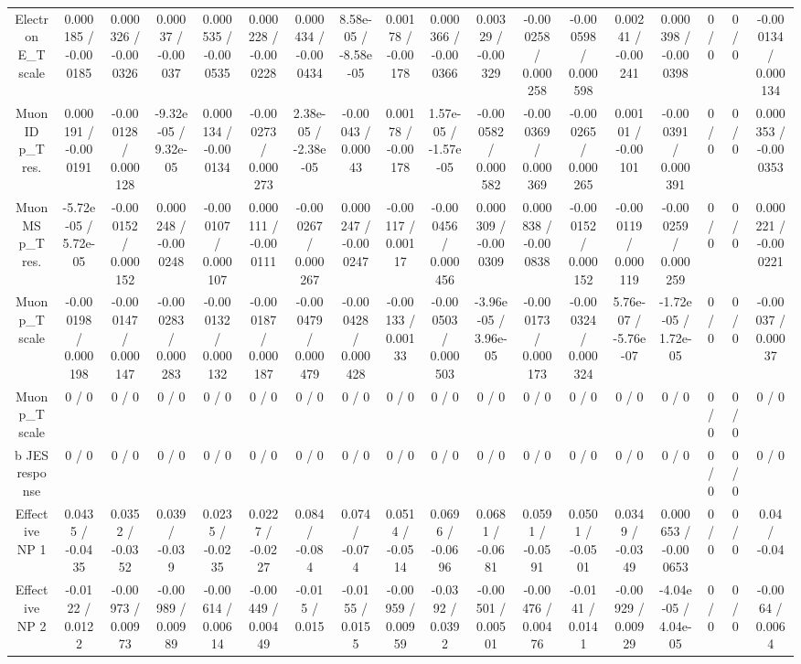 \documentclass[10pt]{article}
\begin{document}
\begin{table}[htbp]
\begin{center}
\begin{tabular}{|c|c|c|c|c|c|c|c|c|c|c|c|c|c|c|c|c|c|}
  Electron E_{T} scale & 0.000185 / -0.000185 & 0.000326 / -0.000326 & 0.00037 / -0.00037 & 0.000535 / -0.000535 & 0.000228 / -0.000228 & 0.000434 / -0.000434 & 8.58e-05 / -8.58e-05 & 0.00178 / -0.00178 & 0.000366 / -0.000366 & 0.00329 / -0.00329 & -0.000258 / 0.000258 & -0.000598 / 0.000598 & 0.00241 / -0.00241 & 0.000398 / -0.000398 & 0 / 0 & 0 / 0 & -0.000134 / 0.000134 \\ 
  Muon ID p_{T} res. & 0.000191 / -0.000191 & -0.000128 / 0.000128 & -9.32e-05 / 9.32e-05 & 0.000134 / -0.000134 & -0.000273 / 0.000273 & 2.38e-05 / -2.38e-05 & -0.00043 / 0.00043 & 0.00178 / -0.00178 & 1.57e-05 / -1.57e-05 & -0.000582 / 0.000582 & -0.000369 / 0.000369 & -0.000265 / 0.000265 & 0.00101 / -0.00101 & -0.000391 / 0.000391 & 0 / 0 & 0 / 0 & 0.000353 / -0.000353 \\ 
  Muon MS p_{T} res. & -5.72e-05 / 5.72e-05 & -0.000152 / 0.000152 & 0.000248 / -0.000248 & -0.000107 / 0.000107 & 0.000111 / -0.000111 & -0.000267 / 0.000267 & 0.000247 / -0.000247 & -0.00117 / 0.00117 & -0.000456 / 0.000456 & 0.000309 / -0.000309 & 0.000838 / -0.000838 & -0.000152 / 0.000152 & -0.000119 / 0.000119 & -0.000259 / 0.000259 & 0 / 0 & 0 / 0 & 0.000221 / -0.000221 \\ 
  Muon p_{T} scale & -0.000198 / 0.000198 & -0.000147 / 0.000147 & -0.000283 / 0.000283 & -0.000132 / 0.000132 & -0.000187 / 0.000187 & -0.000479 / 0.000479 & -0.000428 / 0.000428 & -0.00133 / 0.00133 & -0.000503 / 0.000503 & -3.96e-05 / 3.96e-05 & -0.000173 / 0.000173 & -0.000324 / 0.000324 & 5.76e-07 / -5.76e-07 & -1.72e-05 / 1.72e-05 & 0 / 0 & 0 / 0 & -0.00037 / 0.00037 \\ 
  Muon p_{T} scale & 0 / 0 & 0 / 0 & 0 / 0 & 0 / 0 & 0 / 0 & 0 / 0 & 0 / 0 & 0 / 0 & 0 / 0 & 0 / 0 & 0 / 0 & 0 / 0 & 0 / 0 & 0 / 0 & 0 / 0 & 0 / 0 & 0 / 0 \\ 
  b JES response & 0 / 0 & 0 / 0 & 0 / 0 & 0 / 0 & 0 / 0 & 0 / 0 & 0 / 0 & 0 / 0 & 0 / 0 & 0 / 0 & 0 / 0 & 0 / 0 & 0 / 0 & 0 / 0 & 0 / 0 & 0 / 0 & 0 / 0 \\ 
  Effective NP 1 & 0.0435 / -0.0435 & 0.0352 / -0.0352 & 0.039 / -0.039 & 0.0235 / -0.0235 & 0.0227 / -0.0227 & 0.084 / -0.084 & 0.074 / -0.074 & 0.0514 / -0.0514 & 0.0696 / -0.0696 & 0.0681 / -0.0681 & 0.0591 / -0.0591 & 0.0501 / -0.0501 & 0.0349 / -0.0349 & 0.000653 / -0.000653 & 0 / 0 & 0 / 0 & 0.04 / -0.04 \\ 
  Effective NP 2 & -0.0122 / 0.0122 & -0.00973 / 0.00973 & -0.00989 / 0.00989 & -0.00614 / 0.00614 & -0.00449 / 0.00449 & -0.015 / 0.015 & -0.0155 / 0.0155 & -0.00959 / 0.00959 & -0.0392 / 0.0392 & -0.00501 / 0.00501 & -0.00476 / 0.00476 & -0.0141 / 0.0141 & -0.00929 / 0.00929 & -4.04e-05 / 4.04e-05 & 0 / 0 & 0 / 0 & -0.0064 / 0.0064 \\ 

\end{tabular}
\end{center}
\end{table}
\end{document}
